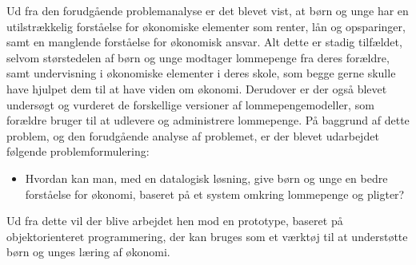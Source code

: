 Ud fra den forudgående problemanalyse er det blevet vist, at børn og unge har en utilstrækkelig forståelse for økonomiske elementer som renter, lån og opsparinger, samt en manglende forståelse for økonomisk ansvar. Alt dette er stadig tilfældet, selvom størstedelen af børn og unge modtager lommepenge fra deres forældre, samt undervisning i økonomiske elementer i deres skole, som begge gerne skulle have hjulpet dem til at have viden om økonomi. Derudover er der også blevet undersøgt og vurderet de forskellige versioner af lommepengemodeller, som forældre bruger til at udlevere og administrere lommepenge. På baggrund af dette problem, og den forudgående analyse af problemet, er der blevet udarbejdet følgende problemformulering:

\begin{itemize}
\item Hvordan kan man, med en datalogisk løsning, give børn og unge en bedre forståelse for økonomi, baseret på et system omkring lommepenge og pligter?
\end{itemize}

Ud fra dette vil der blive arbejdet hen mod en prototype, baseret på objektorienteret programmering, der kan bruges som et værktøj til at understøtte børn og unges læring af økonomi.
